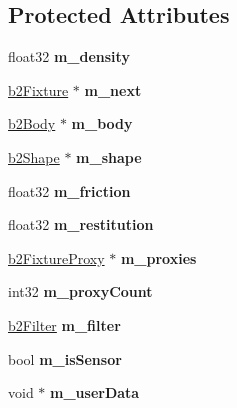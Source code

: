 \subsection*{Protected Attributes}
\begin{DoxyCompactItemize}
\item 
\mbox{\label{classb2Fixture_ab8c388182fc7d58d930f6b0aa21d5c60}} 
float32 {\bfseries m\+\_\+density}
\item 
\mbox{\label{classb2Fixture_aa464962f909cfe76337f67a75bab97cb}} 
\hyperlink{classb2Fixture}{b2\+Fixture} $\ast$ {\bfseries m\+\_\+next}
\item 
\mbox{\label{classb2Fixture_acc6158e9427200077dd6da48fd770257}} 
\hyperlink{classb2Body}{b2\+Body} $\ast$ {\bfseries m\+\_\+body}
\item 
\mbox{\label{classb2Fixture_a2002f3398441d6c8dd0e196740ca4e9e}} 
\hyperlink{classb2Shape}{b2\+Shape} $\ast$ {\bfseries m\+\_\+shape}
\item 
\mbox{\label{classb2Fixture_a314118ee973ebd14e083553fed1e0212}} 
float32 {\bfseries m\+\_\+friction}
\item 
\mbox{\label{classb2Fixture_a343a35683ce4a79d2151761611027d66}} 
float32 {\bfseries m\+\_\+restitution}
\item 
\mbox{\label{classb2Fixture_af77b2ed5d4a2299373262667c81bfe44}} 
\hyperlink{structb2FixtureProxy}{b2\+Fixture\+Proxy} $\ast$ {\bfseries m\+\_\+proxies}
\item 
\mbox{\label{classb2Fixture_aae71b4a0071346aba2eb6f4a764785a4}} 
int32 {\bfseries m\+\_\+proxy\+Count}
\item 
\mbox{\label{classb2Fixture_a33b66959856506a6d27b32dad0e284c7}} 
\hyperlink{structb2Filter}{b2\+Filter} {\bfseries m\+\_\+filter}
\item 
\mbox{\label{classb2Fixture_a4b6b47a8de6d37acf9b980b33b22f634}} 
bool {\bfseries m\+\_\+is\+Sensor}
\item 
\mbox{\label{classb2Fixture_acbe500f3ceeb483aa404516bff8ae51f}} 
void $\ast$ {\bfseries m\+\_\+user\+Data}
\end{DoxyCompactItemize}
